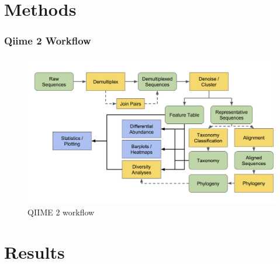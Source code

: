 \documentclass{beamer}
\begin{document}
    \section{Methods}
    \begin{frame}
        \frametitle{Qiime 2 Workflow}

        \begin{figure}
            \includegraphics[width=0.8 \linewidth]{figures/qiime.png}
            \caption{QIIME 2 workflow \protect\cite{qiime1, qiime2, qiime3}}
        \end{figure}
    \end{frame}

    \section{Results}
\end{document}
